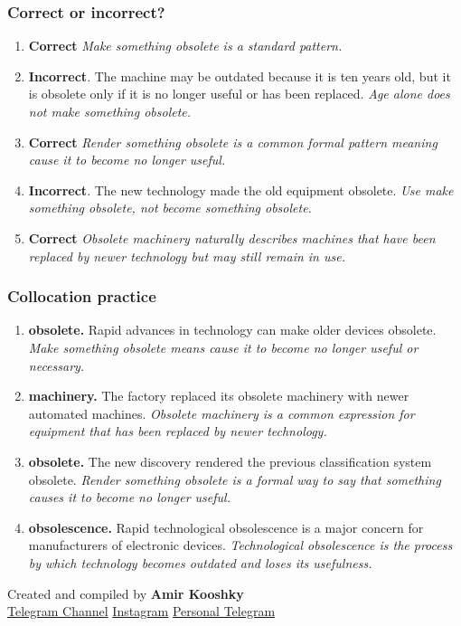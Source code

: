 \documentclass[11pt]{article}
\begin{document}
\subsubsection{Correct or incorrect?}
\begin{enumerate}
  \item \textbf{Correct} \emph{Make something obsolete is a standard pattern.}
  \item \textbf{Incorrect}. The machine may be outdated because it is ten years old, but it is obsolete only if it is no longer useful or has been replaced. \emph{Age alone does not make something obsolete.}
  \item \textbf{Correct} \emph{Render something obsolete is a common formal pattern meaning cause it to become no longer useful.}
  \item \textbf{Incorrect}. The new technology made the old equipment obsolete. \emph{Use make something obsolete, not become something obsolete.}
  \item \textbf{Correct} \emph{Obsolete machinery naturally describes machines that have been replaced by newer technology but may still remain in use.}
\end{enumerate}

\subsubsection{Collocation practice}
\begin{enumerate}
  \item \textbf{obsolete.} Rapid advances in technology can make older devices obsolete. \emph{Make something obsolete means cause it to become no longer useful or necessary.}
  \item \textbf{machinery.} The factory replaced its obsolete machinery with newer automated machines. \emph{Obsolete machinery is a common expression for equipment that has been replaced by newer technology.}
  \item \textbf{obsolete.} The new discovery rendered the previous classification system obsolete. \emph{Render something obsolete is a formal way to say that something causes it to become no longer useful.}
  \item \textbf{obsolescence.} Rapid technological obsolescence is a major concern for manufacturers of electronic devices. \emph{Technological obsolescence is the process by which technology becomes outdated and loses its usefulness.}
\end{enumerate}

\vfill
\begin{center}
\small\color{Muted} Created and compiled by \textbf{Amir Kooshky}\\
\href{https://t.me/KooshkyTOEFL}{Telegram Channel}\quad\textbullet\quad
\href{https://www.instagram.com/kooshkytoefl}{Instagram}\quad\textbullet\quad
\href{https://t.me/KooshkyTOEFL\_pv}{Personal Telegram}
\end{center}
\end{document}
